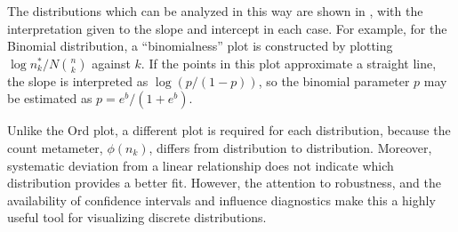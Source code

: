 \documentclass[11pt]{book}
\begin{document}
The distributions which can be analyzed in this way are shown in
, with the interpretation given to the
slope and intercept in each case.
For example, for the Binomial distribution, a ``binomialness''
plot is constructed by plotting $\log n_k^{*} / N \binom{n}{k}$
against $k$.  If the points in this plot approximate a straight
line, the slope is interpreted as $\log (p/(1-p))$, so the
binomial parameter $p$ may be estimated as $p = e^b/(1+e^b)$.


Unlike the Ord plot, a different plot is required for each distribution,
because the count metameter, \(\phi ( n_k )\), differs
from distribution to distribution.
Moreover, systematic deviation from a linear relationship does not
       indicate which distribution provides a better fit.
However, the attention to robustness, and the availability of confidence
intervals and influence diagnostics make this a highly useful tool
for visualizing discrete distributions.
\end{document}
